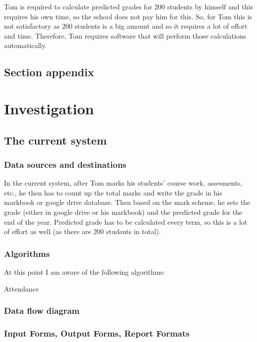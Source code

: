 Tom is required to calculate predicted grades for 200 students by himself and this requires his own time, so the school does not pay him for this. So, for Tom this is not satisfactory as 200 students is a big amount and so it requires a lot of effort and time. Therefore, Tom requires software that will perform those calculations automatically. 
\subsection{Section appendix}

\section{Investigation}

\subsection{The current system}

\subsubsection{Data sources and destinations}

In the current system, after Tom marks his students' course work, assesments, etc., he then has to count up the total marks and write the grade in his markbook or google drive database. Then based on the mark scheme, he sets the grade (either in google drive or his markbook) and the predicted grade for the end of the year. Predicted grade has to be calculated every term, so this is a lot of effort as well (as there are 200 students in total).

\subsubsection{Algorithms}
At this point I am aware of the following algorithms:

Attendance


\subsubsection{Data flow diagram}

\subsubsection{Input Forms, Output Forms, Report Formats}

